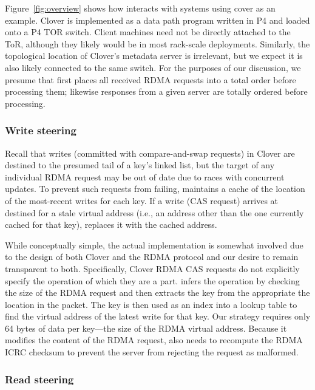Figure~\ref{fig:overview} shows how {\sword} interacts with systems
using cover as an example. Clover is implemented as a data path program written
in P4 and loaded onto a P4 TOR switch.  Client machines need not be directly
attached to the ToR, although they likely would be in most rack-scale
deployments.  Similarly, the topological location of Clover's metadata server is
irrelevant, but we expect it is also likely connected to the same switch.  For
the purposes of our discussion, we presume that {\sword} first places all
received RDMA requests into a total order before processing them; likewise
responses from a given server are totally ordered before processing.

\subsubsection{Write steering}

Recall that writes (committed with compare-and-swap requests) in
Clover are destined to the presumed tail of a key's linked list, but
the target of any individual RDMA request may be out of date due to
races with concurrent updates.  To prevent such requests from
failing, {\sword} maintains a cache of the location of the most-recent writes
for each key. If a write (CAS request) arrives at {\sword}
destined for a stale virtual address (i.e., an address other than the
one currently cached for that key), {\sword} replaces it with
the cached address.

While conceptually simple, the actual implementation is somewhat
involved due to the design of both Clover and the RDMA protocol and
our desire to remain transparent to both.  Specifically, Clover RDMA
CAS requests do not explicitly specify the operation of which they are
a part.  {\sword} infers the operation by checking the size of the
RDMA request and then extracts the key from the appropriate the
location in the packet.  The key is then used as an index into a
lookup table to find the virtual address of the latest write for that
key.  Our strategy requires only 64 bytes of data per key---the size
of the RDMA virtual address.  Because it modifies the content of the
RDMA request, {\sword} also needs to recompute the RDMA ICRC checksum
to prevent the server from rejecting the request as malformed.


\subsubsection{Read steering}

